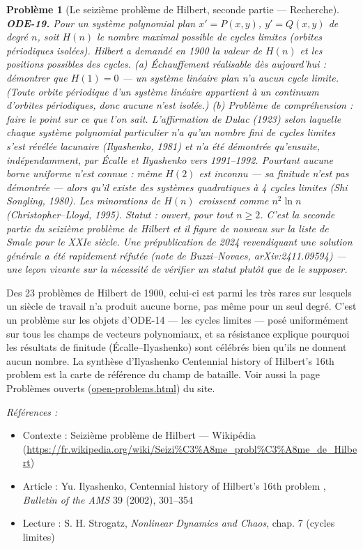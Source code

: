 \documentclass[11pt]{article}
\newtheorem{problem}{Problème}
\newenvironment{refs}{\par\small\noindent\emph{Références :}\begin{itemize}\setlength\itemsep{0pt}}{\end{itemize}\normalsize}
\begin{document}
\begin{problem}[{Le seizième problème de Hilbert, seconde partie --- Recherche}]
\textbf{ODE-19.} Pour un système polynomial plan
$ x' = P(x, y) $, $ y' = Q(x, y) $ de degré $ n $, soit $ H(n) $ le nombre maximal
possible de cycles limites (orbites périodiques isolées). Hilbert a demandé en 1900 la valeur de
$ H(n) $ et les positions possibles des cycles.
(a) Échauffement réalisable dès aujourd'hui : démontrer que $ H(1) = 0 $ --- un système linéaire
plan n'a aucun cycle limite. (Toute orbite périodique d'un système linéaire appartient à un
continuum d'orbites périodiques, donc aucune n'est isolée.)
(b) Problème de compréhension : faire le point sur ce que l'on sait. L'affirmation de Dulac (1923)
selon laquelle chaque système polynomial particulier n'a qu'un nombre fini de cycles limites s'est
révélée lacunaire (Ilyashenko, 1981) et n'a été démontrée qu'ensuite, indépendamment, par Écalle et
Ilyashenko vers 1991--1992. Pourtant aucune borne uniforme n'est connue : même $ H(2) $ est
inconnu --- sa finitude n'est pas démontrée --- alors qu'il existe des systèmes quadratiques à 4 cycles
limites (Shi Songling, 1980). Les minorations de $ H(n) $ croissent comme $ n^2 \ln n $
(Christopher--Lloyd, 1995).
\textit{Statut : ouvert, pour tout $ n \ge 2 $. C'est la seconde partie du seizième problème de
Hilbert et il figure de nouveau sur la liste de Smale pour le XXIe siècle. Une
prépublication de 2024 revendiquant une solution générale a été rapidement réfutée (note de
Buzzi--Novaes, arXiv:2411.09594) --- une leçon vivante sur la nécessité de vérifier un statut plutôt
que de le supposer.}
\end{problem}

\noindent Des 23 problèmes de Hilbert de 1900, celui-ci est parmi les très rares sur
lesquels un siècle de travail n'a produit aucune borne, pas même pour un seul degré. C'est un
problème sur les objets d'ODE-14 --- les cycles limites --- posé uniformément sur tous les champs de
vecteurs polynomiaux, et sa résistance explique pourquoi les résultats de finitude
(Écalle--Ilyashenko) sont célébrés bien qu'ils ne donnent aucun nombre. La synthèse d'Ilyashenko
\og{} Centennial history of Hilbert's 16th problem \fg{} est la carte de référence du champ de bataille.
Voir aussi la page Problèmes ouverts (\url{open-problems.html}) du site.

\begin{refs}
\item Contexte : Seizième problème de Hilbert --- Wikipédia (\url{https://fr.wikipedia.org/wiki/Seizi%C3%A8me_probl%C3%A8me_de_Hilbert})
\item Article : Yu. Ilyashenko, \og{} Centennial history of Hilbert's 16th problem \fg{}, \textit{Bulletin of the AMS} 39 (2002), 301--354
\item Lecture : S. H. Strogatz, \textit{Nonlinear Dynamics and Chaos}, chap. 7 (cycles limites)
\end{refs}
\end{document}
